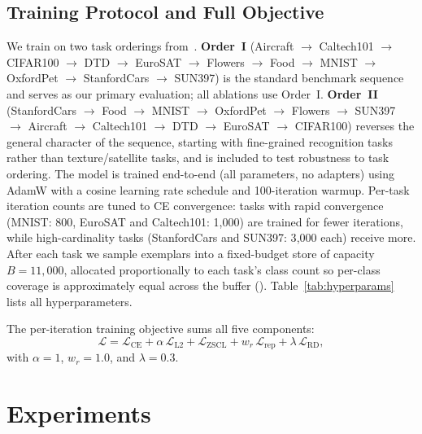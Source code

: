 \documentclass{article}
\begin{document}
  \subsection{Training Protocol and Full Objective}
  We train on two task orderings from~\citet{zheng2023zscl}. \textbf{Order~I}
  (Aircraft $\to$ Caltech101 $\to$ CIFAR100 $\to$ DTD $\to$ EuroSAT $\to$
  Flowers $\to$ Food $\to$ MNIST $\to$ OxfordPet $\to$ StanfordCars $\to$
  SUN397) is the standard benchmark sequence and serves as our primary evaluation;
  all ablations use Order~I. \textbf{Order~II} (StanfordCars $\to$ Food $\to$
  MNIST $\to$ OxfordPet $\to$ Flowers $\to$ SUN397 $\to$ Aircraft $\to$
  Caltech101 $\to$ DTD $\to$ EuroSAT $\to$ CIFAR100) reverses the general
  character of the sequence, starting with fine-grained recognition tasks rather
  than texture/satellite tasks, and is included to test robustness to task
  ordering. The model is trained end-to-end
  (all parameters, no adapters) using AdamW with a cosine learning rate schedule
  and 100-iteration warmup. Per-task iteration counts are tuned to CE convergence:
  tasks with rapid convergence (MNIST: 800, EuroSAT and Caltech101: 1{,}000) are
  trained for fewer iterations, while high-cardinality tasks (StanfordCars and
  SUN397: 3{,}000 each) receive more. After each task we sample exemplars into a
  fixed-budget store of capacity $B{=}11{,}000$, allocated proportionally to each
  task's class count so per-class coverage is approximately equal across the buffer
  (). Table~\ref{tab:hyperparams} lists all hyperparameters.

  The per-iteration training objective sums all five components:
  \begin{equation}
    \mathcal{L} = \mathcal{L}_{\text{CE}}
                + \alpha\,\mathcal{L}_{\text{L2}}
                + \mathcal{L}_{\text{ZSCL}}
                + w_r\,\mathcal{L}_{\text{rep}}
                + \lambda\,\mathcal{L}_{\text{RD}},
    \label{eq:total}
  \end{equation}
  \noindent with $\alpha{=}1$, $w_r{=}1.0$, and $\lambda{=}0.3$.

  \section{Experiments}
  \label{sec:experiments}
\end{document}
